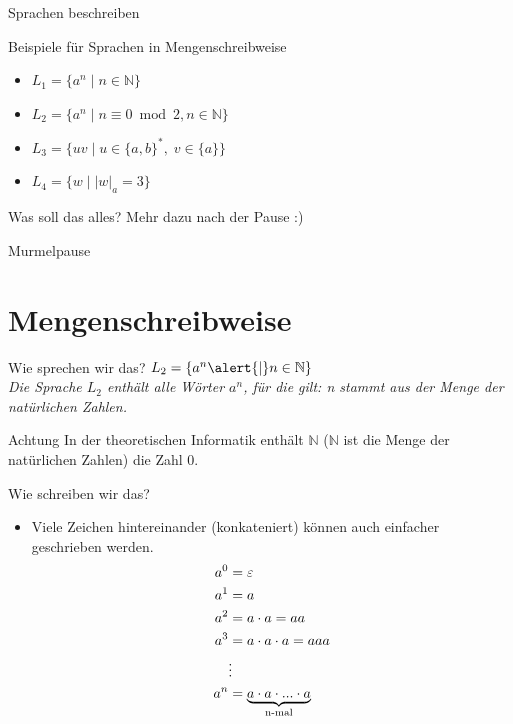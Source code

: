 \begin{frame}[fragile]{Sprachen beschreiben}
    \begin{exampleblock}{Beispiele für Sprachen in Mengenschreibweise}
    \begin{itemize}
        \item $L_1 = \{a^n\;|\;n\in\mathbb{N}\}$
        \item $L_2 = \{a^n\;|\;n \equiv 0 \bmod 2, n\in\mathbb{N}\}$
        \item $L_3 = \{uv\;|\;u\in\{a,b\}^\ast,\;v\in\{a\}\}$
        \item $L_4 = \{w\;|\;|w|_a = 3\}$
    \end{itemize}
    \end{exampleblock}
    Was soll das alles? Mehr dazu nach der Pause :)
\end{frame}

\begin{frame}[standout]
  Murmelpause
\end{frame}

\section{Mengenschreibweise} 



\begin{frame}[fragile]{Wie sprechen wir das?}
$L_2 = \{a^n \alert{\mid} n \in \mathbb{N}\}$ \\

\emph{Die Sprache $L_2$ enthält alle Wörter $a^n$, \alert{für die gilt}: n stammt aus der Menge der natürlichen Zahlen.}
\vspace{5pt}

\begin{alertblock}{Achtung}
    In der theoretischen Informatik enthält $\mathbb{N}$ ($\mathbb{N}$ ist die Menge der natürlichen Zahlen) die Zahl 0.
\end{alertblock}

\end{frame}

\begin{frame}[fragile]{Wie schreiben wir das?}
    \begin{itemize}
        \item
        Viele Zeichen hintereinander (konkateniert) können auch einfacher geschrieben werden.
        \begin{align*}
            a^0 &= \varepsilon\\
            a^1 &= a\\
            a^2 &= a \cdot a = aa\\
            a^3 &= a \cdot a \cdot a = aaa\\
            &\vdots\\
            a^n &= \underbrace{a \cdot a \cdot ... \cdot a}_{\text{n-mal}}
        \end{align*}
        
        \end{itemize}
\end{frame}

